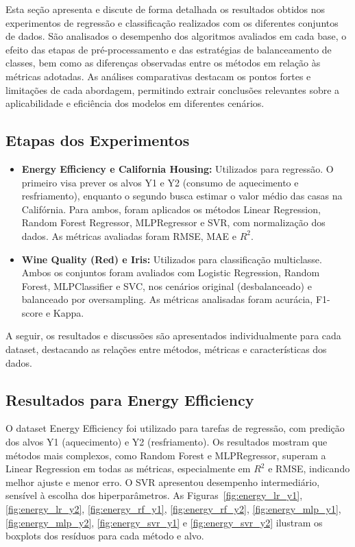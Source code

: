 Esta seção apresenta e discute de forma detalhada os resultados obtidos nos experimentos de regressão e classificação realizados com os diferentes conjuntos de dados. São analisados o desempenho dos algoritmos avaliados em cada base, o efeito das etapas de pré-processamento e das estratégias de balanceamento de classes, bem como as diferenças observadas entre os métodos em relação às métricas adotadas. As análises comparativas destacam os pontos fortes e limitações de cada abordagem, permitindo extrair conclusões relevantes sobre a aplicabilidade e eficiência dos modelos em diferentes cenários.

\subsection{Etapas dos Experimentos}

\begin{itemize}
    \item \textbf{Energy Efficiency e California Housing:} Utilizados para regressão. O primeiro visa prever os alvos Y1 e Y2 (consumo de aquecimento e resfriamento), enquanto o segundo busca estimar o valor médio das casas na Califórnia. Para ambos, foram aplicados os métodos Linear Regression, Random Forest Regressor, MLPRegressor e SVR, com normalização dos dados. As métricas avaliadas foram RMSE, MAE e $R^2$.
    \item \textbf{Wine Quality (Red) e Iris:} Utilizados para classificação multiclasse. Ambos os conjuntos foram avaliados com Logistic Regression, Random Forest, MLPClassifier e SVC, nos cenários original (desbalanceado) e balanceado por oversampling. As métricas analisadas foram acurácia, F1-score e Kappa.
\end{itemize}

A seguir, os resultados e discussões são apresentados individualmente para cada dataset, destacando as relações entre métodos, métricas e características dos dados.

\subsection{Resultados para Energy Efficiency}

O dataset Energy Efficiency foi utilizado para tarefas de regressão, com predição dos alvos Y1 (aquecimento) e Y2 (resfriamento). Os resultados mostram que métodos mais complexos, como Random Forest e MLPRegressor, superam a Linear Regression em todas as métricas, especialmente em $R^2$ e RMSE, indicando melhor ajuste e menor erro. O SVR apresentou desempenho intermediário, sensível à escolha dos hiperparâmetros. As Figuras~\ref{fig:energy_lr_y1}, \ref{fig:energy_lr_y2}, \ref{fig:energy_rf_y1}, \ref{fig:energy_rf_y2}, \ref{fig:energy_mlp_y1}, \ref{fig:energy_mlp_y2}, \ref{fig:energy_svr_y1} e \ref{fig:energy_svr_y2} ilustram os boxplots dos resíduos para cada método e alvo.

